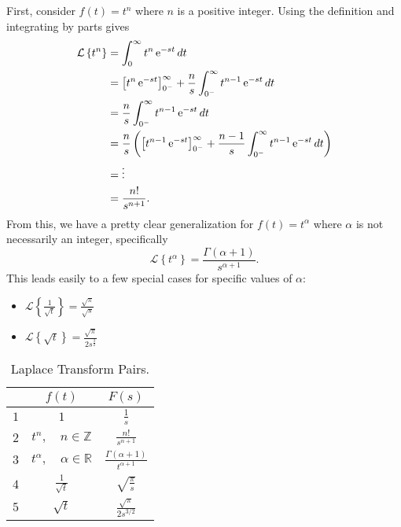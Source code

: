     First, consider $f(t) = t^n$ where $n$ is a positive integer. Using the definition and integrating by parts gives
    \begin{align*}
      \mathcal L \left\{ t^n \right\} &= 
      \int_0^\infty t^n \operatorname{e}^{-s t} dt \\
      &= \left[ t^{n} \operatorname{e}^{-s t} \right]_{0^-}^\infty + \frac{n}{s} \int_{0^-}^\infty t^{n-1} \operatorname{e}^{-s t} dt \\
      &= \frac{n}{s} \int_{0^-}^\infty t^{n-1} \operatorname{e}^{-s t} dt \\
      &= \frac{n}{s} \left( \left[ t^{n-1} \operatorname{e}^{-s t} \right]_{0^-}^\infty + \frac{n-1}{s} \int_{0^-}^\infty t^{n-1} \operatorname{e}^{-s t} dt \right) \\
	&= \vdots  \\
	&= \frac{n!}{s^{n+1}}.
    \end{align*}
    From this, we have a pretty clear generalization for $f(t) = t^\alpha$ where $\alpha$ is not necessarily an integer, specifically
    \begin{equation*}
      \mathcal L \left\{ t^\alpha \right\} = \frac{\Gamma(\alpha + 1)}{s^{\alpha + 1}}.
    \end{equation*}
    This leads easily to a few special cases for specific values of $\alpha$:
    \begin{itemize}
      \item $\mathcal L \left\{ \frac{1}{\sqrt{t}} \right\} = \frac{\sqrt{\pi}}{\sqrt{s}}$
      \item $\mathcal L \left\{ \sqrt{t} \right\} = \frac{\sqrt{\pi}}{2 s^\frac{3}{2}}$
    \end{itemize}

    \begin{table}
      \centering
      \begin{tabular}{|c|c|c|}
	\hline
	 & $f(t)$ & $F(s)$ \\ \hline
	$1$ & $1$ & $\frac{1}{s}$ \\ \hline
	$2$ & $t^n, \quad n \in \mathbb Z$ & $\frac{n!}{s^{n+1}}$ \\ \hline
	$3$ & $t^\alpha, \quad \alpha \in \mathbb R$ & $\frac{\Gamma(\alpha + 1)}{t^{\alpha + 1}}$ \\ \hline
	$4$ & $\frac{1}{\sqrt{t}}$ & $\sqrt{\frac{\pi}{s}} $ \\ \hline
	$5$ & $\sqrt{t}$ & $\frac{\sqrt{\pi}}{2 s^{3/2}} $ \\ \hline
      \end{tabular}
      \caption{Laplace Transform Pairs.}
      \label{tab:ltpairs}
    \end{table}

